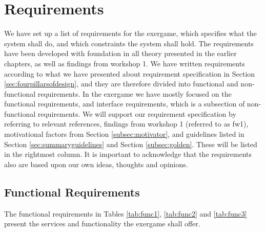 \section{Requirements}
\label{sec:req}
We have set up a list of requirements for the exergame, which specifies what the system shall do, and which constraints the system shall hold. The requirements have been developed with foundation in all theory presented in the earlier chapters, as well as findings from workshop 1. We have written requirements according to what we have presented about requirement specification in Section \ref{sec:fourpillarsofdesign}, and they are therefore divided into functional and non-functional requirements. In the exergame we have mostly focused on the functional requirements, and interface requirements, which is a subsection of non-functional requirements. We will support our requirement specification by referring to relevant references, findings from workshop 1 (referred to as fw1), motivational factors from Section \ref{subsec:motivator}, and guidelines listed in Section \ref{sec:summaryguidelines} and Section \ref{subsec:golden}. These will be listed in the rightmost column. It is important to acknowledge that the requirements also are based upon our own ideas, thoughts and opinions. 

\subsection{Functional Requirements}
The functional requirements in Tables \ref{tab:func1}, \ref{tab:func2} and \ref{tab:func3} present the services and functionality the exergame shall offer.

